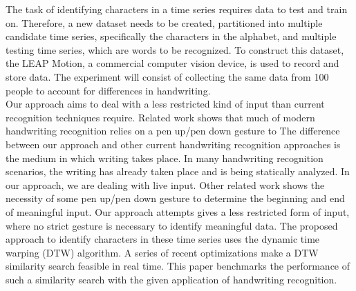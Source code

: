 The task of identifying characters in a time series requires data to test and train on. Therefore, a new dataset needs to be created, partitioned into multiple candidate time series, specifically the characters in the alphabet, and multiple testing time series, which are words to be recognized. To construct this dataset, the LEAP Motion, a commercial computer vision device, is used to record and store data. The experiment will consist of collecting the same data from 100 people to account for differences in handwriting.\\
Our approach aims to deal with a less restricted kind of input than current recognition techniques require. Related work shows that much of modern handwriting recognition relies on a pen up/pen down gesture to 
The difference between our approach and other current handwriting recognition approaches is the medium in which writing takes place. In many handwriting recognition scenarios, the writing has already taken place and is being statically analyzed. In our approach, we are dealing with live input. Other related work shows the necessity of some pen up/pen down gesture to determine the beginning and end of meaningful input. Our approach attempts gives a less restricted form of input, where no strict gesture is necessary to identify meaningful data.
The proposed approach to identify characters in these time series uses the dynamic time warping (DTW) algorithm. A series of recent optimizations make a DTW similarity search feasible in real time. This paper benchmarks the performance of such a similarity search with the given application of handwriting recognition.\\
